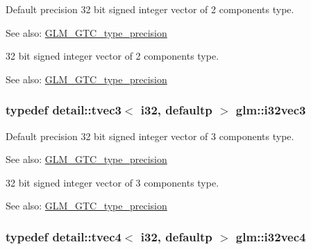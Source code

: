 Default precision 32 bit signed integer vector of 2 components type. \begin{Desc}
\item[See also:]\hyperlink{group__gtc__type__precision}{GLM\_\-GTC\_\-type\_\-precision}\end{Desc}
32 bit signed integer vector of 2 components type. \begin{Desc}
\item[See also:]\hyperlink{group__gtc__type__precision}{GLM\_\-GTC\_\-type\_\-precision} \end{Desc}
\hypertarget{group__gtc__type__precision_g79a21b299190b6fee673087376753db0}{
\subsubsection[i32vec3]{\setlength{\rightskip}{0pt plus 5cm}typedef detail::tvec3$<$ i32, defaultp $>$ {\bf glm::i32vec3}}}
\label{group__gtc__type__precision_g79a21b299190b6fee673087376753db0}


Default precision 32 bit signed integer vector of 3 components type. \begin{Desc}
\item[See also:]\hyperlink{group__gtc__type__precision}{GLM\_\-GTC\_\-type\_\-precision}\end{Desc}
32 bit signed integer vector of 3 components type. \begin{Desc}
\item[See also:]\hyperlink{group__gtc__type__precision}{GLM\_\-GTC\_\-type\_\-precision} \end{Desc}
\hypertarget{group__gtc__type__precision_g5fea6ade2c848bca1fa55636e75a10b9}{
\subsubsection[i32vec4]{\setlength{\rightskip}{0pt plus 5cm}typedef detail::tvec4$<$ i32, defaultp $>$ {\bf glm::i32vec4}}}
\label{group__gtc__type__precision_g5fea6ade2c848bca1fa55636e75a10b9}


